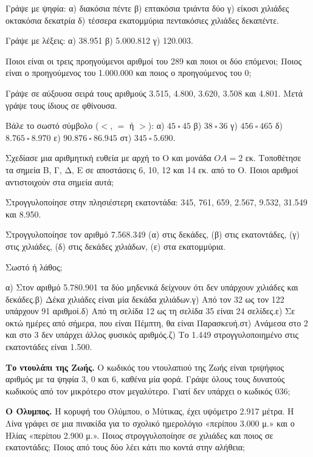 

\ex Γράψε με ψηφία: α) διακόσια πέντε \quad β) επτακόσια τριάντα δύο \quad γ) είκοσι χιλιάδες οκτακόσια δεκατρία \quad δ) τέσσερα εκατομμύρια πεντακόσιες χιλιάδες δεκαπέντε.

\ex Γράψε με λέξεις: α) 38.951 \quad β) 5.000.812 \quad γ) 120.003.

\ex Ποιοι είναι οι τρεις προηγούμενοι αριθμοί του 289 και ποιοι οι δύο επόμενοι; Ποιος είναι ο προηγούμενος του 1.000.000 και ποιος ο προηγούμενος του 0;

\ex Γράψε σε αύξουσα σειρά τους αριθμούς 3.515, 4.800, 3.620, 3.508 και 4.801. Μετά γράψε τους ίδιους σε φθίνουσα.

\ex Βάλε το σωστό σύμβολο ($<$, $=$ ή $>$): α) $45\ \square\ 45$ \quad β) $38\ \square\ 36$ \quad γ) $456\ \square\ 465$ \quad δ) $8.765\ \square\ 8.970$ \quad ε) $90.876\ \square\ 86.945$ \quad στ) $345\ \square\ 5.690$.

\ex Σχεδίασε μια αριθμητική ευθεία με αρχή το Ο και μονάδα $ΟΑ=2$ εκ. Τοποθέτησε τα σημεία Β, Γ, Δ, Ε σε αποστάσεις 6, 10, 12 και 14 εκ. από το Ο. Ποιοι αριθμοί αντιστοιχούν στα σημεία αυτά;

\ex Στρογγυλοποίησε στην πλησιέστερη εκατοντάδα: 345, 761, 659, 2.567, 9.532, 31.549 και 8.950.

\ex Στρογγυλοποίησε τον αριθμό 7.568.349 (α) στις δεκάδες, (β) στις εκατοντάδες, (γ) στις χιλιάδες, (δ) στις δεκάδες χιλιάδων, (ε) στα εκατομμύρια.

\ex Σωστό ή λάθος;\par
α) Στον αριθμό 5.780.901 τα δύο μηδενικά δείχνουν ότι δεν υπάρχουν χιλιάδες και δεκάδες.\quad β) Δέκα χιλιάδες είναι μία δεκάδα χιλιάδων.\quad γ) Από τον 32 ως τον 122 υπάρχουν 91 αριθμοί.\quad δ) Από τη σελίδα 12 ως τη σελίδα 35 είναι 24 σελίδες.\quad ε) Σε οκτώ ημέρες από σήμερα, που είναι Πέμπτη, θα είναι Παρασκευή.\quad στ) Ανάμεσα στο 2 και στο 3 δεν υπάρχει άλλος φυσικός αριθμός.\quad ζ) Το 1.449 στρογγυλοποιημένο στις εκατοντάδες είναι 1.500.


\ex \textbf{Το ντουλάπι της Ζωής.} Ο κωδικός του ντουλαπιού της Ζωής είναι τριψήφιος αριθμός με τα ψηφία 3, 0 και 6, καθένα μία φορά. Γράψε όλους τους δυνατούς κωδικούς από τον μικρότερο στον μεγαλύτερο. Γιατί δεν υπάρχει ο κωδικός 036;

\ex \textbf{Ο Όλυμπος.} Η κορυφή του Ολύμπου, ο Μύτικας, έχει υψόμετρο 2.917 μέτρα. Η Λίνα γράφει σε μια πινακίδα για το σχολικό ημερολόγιο «περίπου 3.000 μ.» και ο Ηλίας «περίπου 2.900 μ.». Ποιος στρογγυλοποίησε σε χιλιάδες και ποιος σε εκατοντάδες; Ποιος από τους δύο λέει κάτι πιο κοντά στην αλήθεια;

